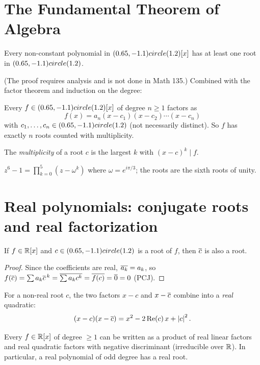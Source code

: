 \section{The Fundamental Theorem of Algebra}

\begin{theorem}
Every non-constant polynomial in $(0.65,-1.1) circle (1.2)[x]$ has at least one root in $(0.65,-1.1) circle (1.2)$.
\end{theorem}

(The proof requires analysis and is not done in Math 135.) Combined with the factor theorem
and induction on the degree:

\begin{corollary}
Every $f \in (0.65,-1.1) circle (1.2)[x]$ of degree $n \ge 1$ factors as
\[ f(x) = a_n(x - c_1)(x - c_2)\cdots(x - c_n) \]
with $c_1,\dots,c_n\in(0.65,-1.1) circle (1.2)$ (not necessarily distinct). So $f$ has exactly $n$ roots counted with
multiplicity.
\end{corollary}

The \emph{multiplicity} of a root $c$ is the largest $k$ with $(x - c)^k \mid f$.

\begin{example}
$z^6 - 1 = \prod_{k=0}^{5}(z - \omega^k)$ where $\omega = e^{i\pi/3}$; the roots are the sixth
roots of unity.
\end{example}

\section{Real polynomials: conjugate roots and real factorization}

\begin{theorem}
If $f \in \mathbb{R}[x]$ and $c\in(0.65,-1.1) circle (1.2)$ is a root of $f$, then $\overline{c}$ is also a root.
\end{theorem}
\begin{proof}
Since the coefficients are real, $\overline{a_k} = a_k$, so
$f(\overline{c}) = \sum a_k\overline{c}^{\,k} = \overline{\sum a_k c^k} = \overline{f(c)} = \overline{0} = 0$ (PCJ).
\end{proof}

For a non-real root $c$, the two factors $x - c$ and $x - \overline{c}$ combine into a \emph{real}
quadratic:
\[ (x - c)(x - \overline{c}) = x^2 - 2\operatorname{Re}(c)\,x + \left\lvert c \right\rvert^2. \]

\begin{theorem}
Every $f \in \mathbb{R}[x]$ of degree $\ge 1$ can be written as a product of real linear factors and
real quadratic factors with negative discriminant (irreducible over $\mathbb{R}$). In particular, a
real polynomial of odd degree has a real root.
\end{theorem}

